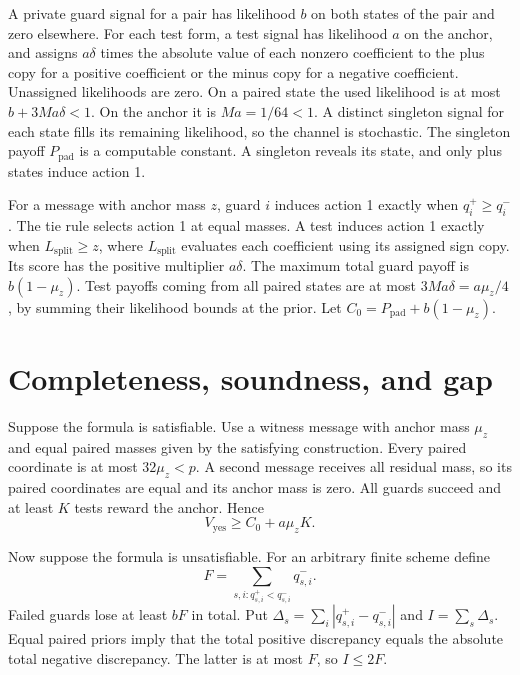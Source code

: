 \documentclass[11pt,a4paper]{amsart}
\begin{document}
A private guard signal for a pair has likelihood \(b\) on both
states of the pair and zero elsewhere. For each test form, a test
signal has likelihood \(a\) on the anchor, and assigns \(a\delta\)
times the absolute value of each nonzero coefficient to the plus
copy for a positive coefficient or the minus copy for a negative
coefficient. Unassigned likelihoods are zero.
On a paired state the used likelihood is at most
\(b+3Ma\delta<1\). On the anchor it is \(Ma=1/64<1\).
A distinct singleton signal for each state fills its remaining
likelihood, so the channel is stochastic. The singleton payoff
\(P_{\mathrm{pad}}\) is a computable constant. A singleton
reveals its state, and only plus states induce action 1.

For a message with anchor mass \(z\), guard \(i\) induces action 1
exactly when \(q_i^+\geq q_i^-\). The tie rule selects action 1 at
equal masses. A test induces action 1 exactly when
\(L_{\mathrm{split}}\geq z\), where \(L_{\mathrm{split}}\) evaluates
each coefficient using its assigned sign copy. Its score has the
positive multiplier \(a\delta\). The maximum total guard payoff
is \(b(1-\mu_z)\). Test payoffs coming from all paired states are
at most \(3Ma\delta=a\mu_z/4\), by summing their likelihood bounds
at the prior. Let \(C_0=P_{\mathrm{pad}}+b(1-\mu_z)\).

\section{Completeness, soundness, and gap}

Suppose the formula is satisfiable. Use a witness message with
anchor mass \(\mu_z\) and equal paired masses given by the satisfying
construction. Every paired coordinate is at most \(32\mu_z<p\).
A second message receives all residual mass, so its paired
coordinates are equal and its anchor mass is zero. All guards
succeed and at least \(K\) tests reward the anchor. Hence
\[
 V_{\mathrm{yes}}\geq C_0+a\mu_z K.
\]

Now suppose the formula is unsatisfiable. For an arbitrary finite
scheme define
\[
 F=\sum_{s,i:q_{s,i}^+<q_{s,i}^-}q_{s,i}^- .
\]
Failed guards lose at least \(bF\) in total. Put
\(\Delta_s=\sum_i|q_{s,i}^+-q_{s,i}^-|\) and \(I=\sum_s\Delta_s\).
Equal paired priors imply that the total positive discrepancy equals
the absolute total negative discrepancy. The latter is at most \(F\),
so \(I\leq2F\).
\end{document}
